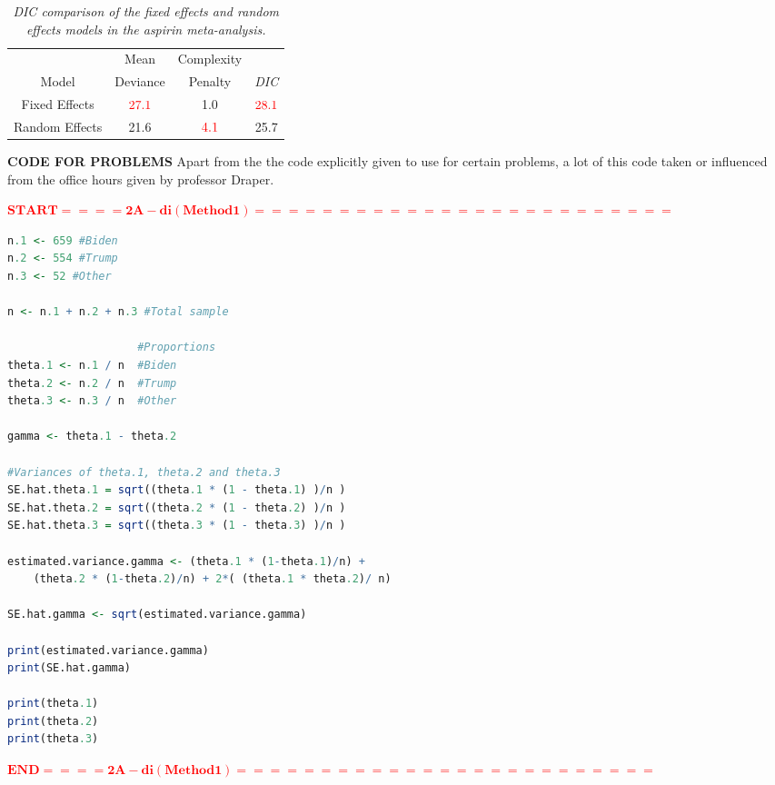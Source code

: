 \documentclass[12pt]{article}
\newcommand{\tcr}[1]{\textcolor{red}{#1}}
\begin{document}
\begin{itemize}
\begin{table}[t!]
\centering

\caption{\textit{DIC comparison of the fixed effects and random effects models in the aspirin meta-analysis.}}

\label{t:dic-comparison}

\bigskip

\begin{tabular}{c|ccc}

& Mean & Complexity \\
Model & Deviance & Penalty & \textit{DIC} \\

\hline

Fixed Effects & $\tcr{27.1 }$& 1.0 &  $\tcr{28.1}$\\
Random Effects & 21.6 & $\tcr{4.1}$& 25.7

\end{tabular}

\end{table}

\vspace*{3.0in}

\end{itemize}

\newpage

\textbf{CODE FOR PROBLEMS}
Apart from the the code explicitly given to use for certain problems, a lot of this code taken or influenced from the office hours given by professor Draper. 

\tcr{$\bm{START ==== 2A - di (Method 1) =========================}$}
\begin{lstlisting}[language = R]
n.1 <- 659 #Biden
n.2 <- 554 #Trump
n.3 <- 52 #Other

n <- n.1 + n.2 + n.3 #Total sample

                    #Proportions
theta.1 <- n.1 / n  #Biden
theta.2 <- n.2 / n  #Trump
theta.3 <- n.3 / n  #Other

gamma <- theta.1 - theta.2

#Variances of theta.1, theta.2 and theta.3
SE.hat.theta.1 = sqrt((theta.1 * (1 - theta.1) )/n )
SE.hat.theta.2 = sqrt((theta.2 * (1 - theta.2) )/n )
SE.hat.theta.3 = sqrt((theta.3 * (1 - theta.3) )/n )

estimated.variance.gamma <- (theta.1 * (1-theta.1)/n) + 
    (theta.2 * (1-theta.2)/n) + 2*( (theta.1 * theta.2)/ n)

SE.hat.gamma <- sqrt(estimated.variance.gamma)

print(estimated.variance.gamma)
print(SE.hat.gamma)

print(theta.1)
print(theta.2)
print(theta.3)
\end{lstlisting}
\tcr{$\bm{END ==== 2A - di (Method 1) =========================}$}
\end{document}
